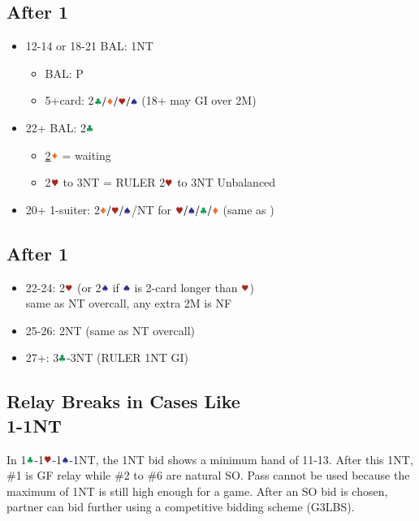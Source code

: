 \documentclass{article}
\begin{document}
\begin{multicols}{2}
\begin{CJK*}{UTF8}{gt}
\subsection{After 1\SSS}
\label{sec:1c1d1h1s}
\begin{itemize}
    \item 12-14 or 18-21 BAL: 1NT
    \begin{itemize}
        \item BAL: P
        \item 5+card: 2$\ccc/\ddd/\hhh/\sss$ (18+ may GI over 2M)
    \end{itemize}
    \item 22+ BAL: 2$\ccc$
    \begin{itemize}
        \item \hyperref[sec:1c1d1h1s2c2d]{2$\ddd$} = waiting
        \item 2$\hhh$ to 3NT = RULER 2$\hhh$ to 3NT Unbalanced
    \end{itemize}
    \item 20+ 1-suiter: 2$\ddd/\hhh/\sss$/NT for $\hhh/\sss/\ccc/\ddd$ (same as )
\end{itemize}

\subsection{After 1\DDD}
\label{sec:1c1d1h1s2c2d}
\begin{itemize}
    \item 22-24: 2$\hhh$ (or 2$\sss$ if $\sss$ is 2-card longer than $\hhh$) \\
        same as NT overcall, any extra 2M is NF
    \item 25-26: 2NT (same as NT overcall)
    \item 27+: 3$\ccc$-3NT (RULER 1NT GI)
\end{itemize}

\subsection{Relay Breaks in Cases Like \texorpdfstring{\\}{}
1\SSS-1NT}
In 1$\ccc$-1$\hhh$-1$\sss$-1NT, the 1NT bid shows a minimum hand of 11-13. After this 1NT, \#1 is GF relay while \#2 to \#6 are natural SO. Pass cannot be used because the maximum of 1NT is still high enough for a game. After an SO bid is chosen, partner can bid further using a competitive bidding scheme (G3LBS).


\end{CJK*}
\end{multicols}
\end{document}
